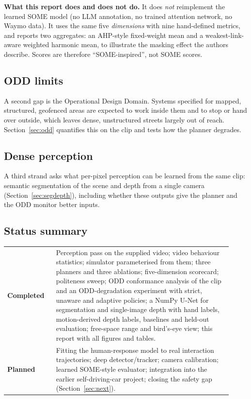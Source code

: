 \documentclass[11pt,a4paper]{article}
\newcommand{\done}{\textcolor{green!45!black}{\textbf{Completed}}}
\newcommand{\planned}{\textcolor{orange!80!black}{\textbf{Planned}}}
\begin{document}
\textbf{What this report does and does not do.} It does \emph{not} reimplement the learned SOME model (no LLM annotation, no trained attention network, no Waymo data). It uses the same five \emph{dimensions} with nine hand-defined metrics, and reports two aggregates: an AHP-style fixed-weight mean and a weakest-link-aware weighted harmonic mean, to illustrate the masking effect the authors describe. Scores are therefore ``SOME-inspired'', not SOME scores.

\subsection*{ODD limits}
A second gap is the Operational Design Domain. Systems specified for mapped, structured, geofenced areas are expected to work inside them and to stop or hand over outside, which leaves dense, unstructured streets largely out of reach. Section~\ref{sec:odd} quantifies this on the clip and tests how the planner degrades.

\subsection*{Dense perception}
A third strand asks what per-pixel perception can be learned from the same clip: semantic segmentation of the scene and depth from a single camera (Section~\ref{sec:segdepth}), including whether these outputs give the planner and the ODD monitor better inputs.

\subsection*{Status summary}
\begin{center}\small
\begin{tabular}{@{}p{0.2\linewidth}p{0.72\linewidth}@{}}
\toprule
\done & Perception pass on the supplied video; video behaviour statistics; simulator parameterised from them; three planners and three ablations; five-dimension scorecard; politeness sweep; ODD conformance analysis of the clip and an ODD-degradation experiment with strict, unaware and adaptive policies; a NumPy U-Net for segmentation and single-image depth with hand labels, motion-derived depth labels, baselines and held-out evaluation; free-space range and bird's-eye view; this report with all figures and tables.\\
\planned & Fitting the human-response model to real interaction trajectories; deep detector/tracker; camera calibration; learned SOME-style evaluator; integration into the earlier self-driving-car project; closing the safety gap (Section~\ref{sec:next}).\\
\bottomrule
\end{tabular}
\end{center}
\end{document}
